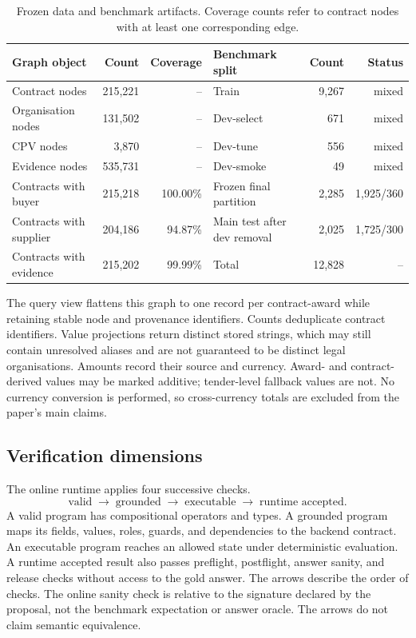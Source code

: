 \begin{table}[t]
  \centering
  \caption{Frozen data and benchmark artifacts.  Coverage counts refer to contract nodes with at
  least one corresponding edge.}
  \label{tab:data-stats}
  \small
  \begin{tabular}{lrr@{\qquad}lrr}
    \toprule
    Graph object & Count & Coverage & Benchmark split & Count & Status \\
    \midrule
    Contract nodes & 215,221 & -- & Train & 9,267 & mixed \\
    Organisation nodes & 131,502 & -- & Dev-select & 671 & mixed \\
    CPV nodes & 3,870 & -- & Dev-tune & 556 & mixed \\
    Evidence nodes & 535,731 & -- & Dev-smoke & 49 & mixed \\
    Contracts with buyer & 215,218 & 100.00\% & Frozen final partition & 2,285 & 1,925/360 \\
    Contracts with supplier & 204,186 & 94.87\% & Main test after dev removal & 2,025 & 1,725/300 \\
    Contracts with evidence & 215,202 & 99.99\% & Total & 12,828 & -- \\
    \bottomrule
  \end{tabular}
\end{table}

The query view flattens this graph to one record per contract-award while retaining stable node and
provenance identifiers.  Counts deduplicate contract identifiers.  Value projections return
distinct stored strings, which may still contain unresolved aliases and are not guaranteed to be
distinct legal organisations.  Amounts record their source and currency.  Award- and
contract-derived values may be marked additive; tender-level fallback values are not.  No currency
conversion is performed, so cross-currency totals are excluded from the paper's main claims.

\subsection{Verification dimensions}

The online runtime applies four successive checks.
\begin{equation}
  \text{valid}\;\longrightarrow\;\text{grounded}\;\longrightarrow\;
  \text{executable}\;\longrightarrow\;\text{runtime accepted}.
  \label{eq:online-checks}
\end{equation}
A valid program has compositional operators and types.  A grounded program maps its fields, values,
roles, guards, and dependencies to the backend contract.  An executable program reaches an allowed
state under deterministic evaluation.  A runtime accepted result also passes preflight, postflight,
answer sanity, and release checks without access to the gold answer.  The arrows describe the order
of checks.  The online sanity check is relative to the signature declared by the proposal, not the
benchmark expectation or answer oracle.  The arrows do not claim semantic equivalence.

